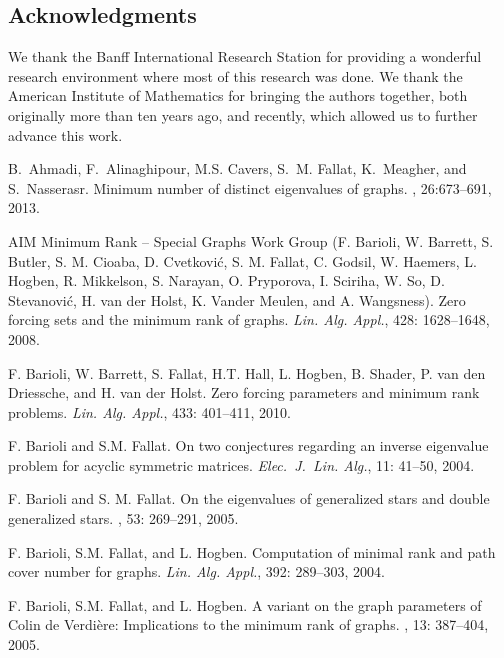 \documentclass[11pt]{article}
\theoremstyle{definition}
\theoremstyle{definition}
\theoremstyle{definition}
\begin{document}

\subsection*{Acknowledgments}  We thank the Banff International Research Station for providing a wonderful research environment where most of this research was done.  We thank the American Institute of Mathematics for bringing the authors together, both originally more than ten years ago, and recently, which allowed us to further advance this work. %


\begin{thebibliography}{1}

B.~Ahmadi, F.~Alinaghipour, M.S. Cavers, S.~M. Fallat, K.~Meagher, and
  S.~Nasserasr.
\newblock Minimum number of distinct eigenvalues of graphs.  
, 26:673--691, 2013.  %

 AIM Minimum Rank -- Special Graphs Work Group 
(F. Barioli, W. Barrett, 
S. Butler,   
S. M. Cioaba, D. Cvetkovi\'c, 
 S. M. Fallat,
C. Godsil,  
W. Haemers,  
L. Hogben,  R. Mikkelson,  S. Narayan,  O. Pryporova,   
I. Sciriha,  W. So,   D. Stevanovi\'c,  H. van der Holst,
K. Vander Meulen, and
A. Wangsness).  Zero forcing sets and the minimum rank  
of graphs.   {\em Lin. Alg. Appl.}, 
428: 1628--1648, 2008.

	 F. Barioli, W. Barrett, S. Fallat, H.T. Hall, 
L. Hogben, B. Shader, P. van den Driessche, and H. van der Holst.  
Zero forcing parameters and minimum rank problems.  
{\em Lin. Alg. Appl.}, 433: 401--411, 2010.

	F. Barioli and S.M. Fallat. 
 On two conjectures regarding an inverse eigenvalue problem for acyclic symmetric matrices.
{\em Elec.~J.~Lin. Alg.},
11: 41--50, 2004. 

	F. Barioli and S. M. Fallat. 
\newblock On the eigenvalues of generalized stars and double generalized stars.
,
53: 269--291, 2005.

 F. Barioli, S.M. Fallat, and L. Hogben.
 Computation of minimal rank and path cover number for graphs.
 {\em Lin. Alg. Appl.},
392: 289--303, 2004. 

	F. Barioli, S.M. Fallat, and L. Hogben.
\newblock A variant on the graph parameters of Colin de Verdi\`ere:
Implications to the minimum rank of graphs.
,
13: 387--404, 2005.    



\end{thebibliography}
\end{document}
